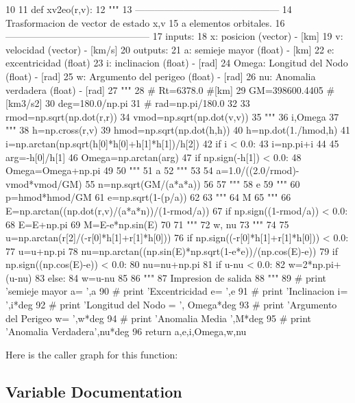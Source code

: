 \begin{DoxyCode}
10 
11 def xv2eo(r,v):
12     """
13     ---------------------------------------------
14     Trasformacion de vector de estado x,v
15     a elementos orbitales.
16     ---------------------------------------------
17     inputs:
18         x: posicion (vector) - [km]
19         v: velocidad (vector) - [km/s]
20     outputs:
21         a: semieje mayor (float) - [km]
22         e: excentricidad (float)
23         i: inclinacion (float) - [rad]
24         Omega: Longitud del Nodo (float) - [rad]
25         w: Argumento del perigeo (float) - [rad]
26         nu: Anomalia verdadera (float) - [rad]
27     """
28 #    Rt=6378.0 #[km]
29     GM=398600.4405 #[km3/s2]
30     deg=180.0/np.pi 
31 #    rad=np.pi/180.0
32     
33     rmod=np.sqrt(np.dot(r,r))
34     vmod=np.sqrt(np.dot(v,v))
35     """
36     i,Omega
37     """
38     h=np.cross(r,v)
39     hmod=np.sqrt(np.dot(h,h))
40     h=np.dot(1./hmod,h)
41     i=np.arctan(np.sqrt(h[0]*h[0]+h[1]*h[1])/h[2])
42     if i < 0.0:
43         i=np.pi+i
44         
45     arg=-h[0]/h[1]
46     Omega=np.arctan(arg)
47     if np.sign(-h[1]) < 0.0:
48         Omega=Omega+np.pi
49 
50     """
51      a
52     """
53      
54     a=1.0/((2.0/rmod)-vmod*vmod/GM)
55     n=np.sqrt(GM/(a*a*a))
56     
57     """
58      e
59     """
60     p=hmod*hmod/GM
61     e=np.sqrt(1-(p/a))
62     
63     """
64      M    
65     """
66     E=np.arctan((np.dot(r,v)/(a*a*n))/(1-rmod/a))
67     if np.sign((1-rmod/a)) < 0.0:
68         E=E+np.pi
69     M=E-e*np.sin(E)
70 
71     """
72      w, nu
73     """
74 
75     u=np.arctan(r[2]/(-r[0]*h[1]+r[1]*h[0]))
76     if np.sign((-r[0]*h[1]+r[1]*h[0])) < 0.0:
77         u=u+np.pi
78     nu=np.arctan((np.sin(E)*np.sqrt(1-e*e))/(np.cos(E)-e))
79     if np.sign((np.cos(E)-e)) < 0.0:
80         nu=nu+np.pi
81     if u-nu < 0.0:
82         w=2*np.pi+(u-nu)
83     else:
84         w=u-nu
85     
86     """
87     Impresion de salida
88     """
89 #     print 'semieje mayor a= ',a
90 #     print 'Excentricidad e= ',e
91 #     print 'Inclinacion i= ',i*deg
92 #     print 'Longitud del Nodo = ', Omega*deg
93 #     print 'Argumento del Perigeo w= ',w*deg
94 #     print 'Anomalia Media ',M*deg
95 #     print 'Anomalia Verdadera',nu*deg
96     return a,e,i,Omega,w,nu
    
\end{DoxyCode}


\-Here is the caller graph for this function\-:




\subsection{\-Variable \-Documentation}
